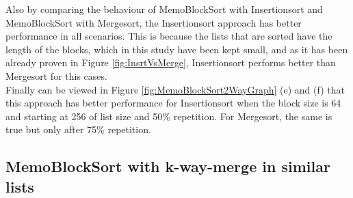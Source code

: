 \documentclass[a4paper,12pt]{article}
\begin{document}
Also by comparing the behaviour of MemoBlockSort with Insertionsort and MemoBlockSort with Mergesort, the Insertionsort approach has better performance in all scenarios. This is because the lists that are sorted have the length of the blocks, which in this study have been kept small, and as it has been already proven in Figure \ref{fig:InsrtVsMerge}, Insertionsort performs better than Mergesort for this cases.\\


Finally can be viewed in Figure \ref{fig:MemoBlockSort2WayGraph} (e) and (f) that this approach has better performance for Insertionsort when the block size is 64 and starting at 256 of list size and 50\% repetition. For Mergesort, the same is true but only after 75\% repetition.

\subsection{MemoBlockSort with k-way-merge in similar lists}
\end{document}
